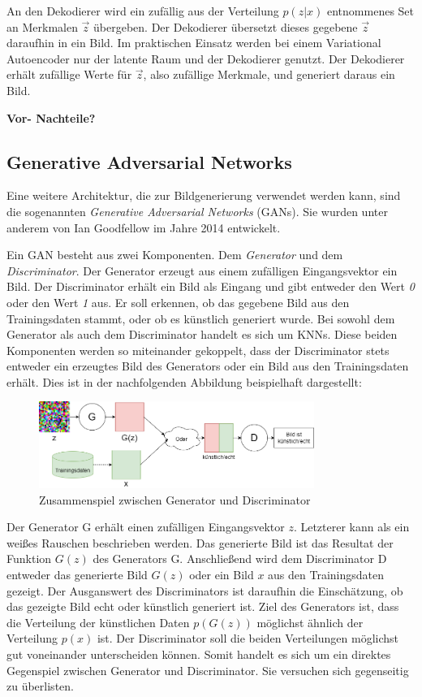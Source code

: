 An den Dekodierer wird ein zufällig aus der Verteilung $p(z|x)$ entnommenes Set an Merkmalen $\vec{z}$ übergeben.
Der Dekodierer übersetzt dieses gegebene $\vec{z}$ daraufhin in ein Bild. Im praktischen Einsatz werden bei einem Variational Autoencoder nur der latente Raum und der Dekodierer genutzt. Der Dekodierer erhält zufällige Werte für $\vec{z}$, also zufällige Merkmale, und generiert daraus ein Bild.

\textbf{Vor- Nachteile?}

\cite{autoencoders}

\label{chap:GANs}
\subsection{Generative Adversarial Networks}
Eine weitere Architektur, die zur Bildgenerierung verwendet werden kann, sind die sogenannten \emph{Generative Adversarial Networks} (\acsp{GAN}). Sie wurden unter anderem von Ian Goodfellow im Jahre 2014 entwickelt.

Ein \ac{GAN} besteht aus zwei Komponenten. Dem \emph{Generator} und dem \emph{Discriminator}.
Der Generator erzeugt aus einem zufälligen Eingangsvektor ein Bild. Der Discriminator erhält ein Bild als Eingang und gibt entweder den Wert \emph{0} oder den Wert \emph{1} aus. Er soll erkennen, ob das gegebene Bild aus den Trainingsdaten stammt, oder ob es künstlich generiert wurde. Bei sowohl dem Generator als auch dem Discriminator handelt es sich um \acp{KNN}. Diese beiden Komponenten werden so miteinander gekoppelt, dass der Discriminator stets entweder ein erzeugtes Bild des Generators oder ein Bild aus den Trainingsdaten erhält. Dies ist in der nachfolgenden Abbildung beispielhaft dargestellt:
\begin{figure}[H]
	\centering
	\includegraphics[width=0.8\textwidth]{../images/GANs/GAN.drawio.png}
	\caption{Zusammenspiel zwischen Generator und Discriminator}
	\label{fig:gan}
\end{figure}
Der Generator G erhält einen zufälligen Eingangsvektor $z$. Letzterer kann als ein weißes Rauschen beschrieben werden. Das generierte Bild ist das Resultat der Funktion $G(z)$ des Generators G. Anschließend wird dem Discriminator D entweder das generierte Bild $G(z)$ oder ein Bild $x$ aus den Trainingsdaten gezeigt. Der Ausganswert des Discriminators ist daraufhin die Einschätzung, ob das gezeigte Bild echt oder künstlich generiert ist. Ziel des Generators ist, dass die Verteilung der künstlichen Daten $p(G(z))$ möglichst ähnlich der Verteilung $p(x)$ ist. Der Discriminator soll die beiden Verteilungen möglichst gut voneinander unterscheiden können. Somit handelt es sich um ein direktes Gegenspiel zwischen Generator und Discriminator. Sie versuchen sich gegenseitig zu überlisten.

